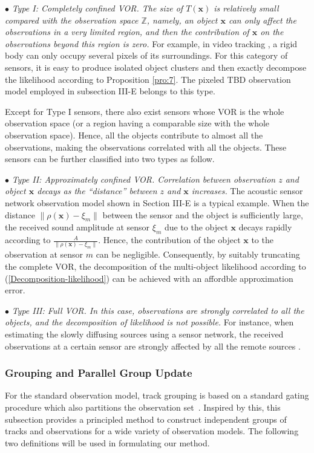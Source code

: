 \documentclass[journal]{IEEEtran}
\newcommand{\bx}{{\mathbf x}}
\begin{document}
{$\bullet$ \textit{Type I: Completely confined VOR. The size of  $T(\bx)$ is relatively small compared with the observation space $\mathbb{Z}$, namely,  an object $\bx$ can only affect  the observations in a  very limited region,  and then the  contribution of $\bx$ on the observations beyond this region is zero. } For example, in video tracking \cite{refr:MeMber_filter,refr:computer-vision,refr:vedio-tracking}, a  rigid body   can only occupy several  pixels of its surroundings. For this category of sensors, it is easy to produce  isolated object clusters  and then exactly decompose the likelihood according to Proposition \ref{pro:7}. The pixeled TBD observation model employed in subsection III-E belongs to this type.




Except for Type I sensors, there also exist sensors  whose VOR is  the whole observation space (or a region having a comparable  size with the whole observation space). Hence,  all the objects   contribute to almost all  the observations, making the  observations correlated with all the objects. These sensors    can be further classified into two types as follow.

$\bullet$ \textit{Type II: Approximately confined VOR. Correlation between  observation $z$ and  object $\bx$ decays as the ``distance'' between $z$ and $\bx$ increases. } The acoustic sensor network  observation model \cite{refr:amplitude} shown in Section III-E is a typical example. When the distance $\|\rho(\bx)-\xi_{m}\|$ between the sensor  and the object   is sufficiently large, the received sound amplitude  at sensor $\xi_{m}$ due to the object $\bx$ decays rapidly according to $\frac{A}{\|\rho(\bx)-\xi_{m}\|}$. Hence, the contribution of  the object $\bx$ to the observation  at sensor $m$ can be negligible. Consequently,   by suitably truncating the complete VOR,  the decomposition of the multi-object likelihood according to (\ref{Decomposition-likelihood}) can be achieved with an affordble approximation error. 

$\bullet$  \textit{Type III: Full VOR.  In this case, observations are strongly correlated to all the objects, and the decomposition of likelihood  is  not possible.}
For instance, when estimating the slowly diffusing sources using a sensor network, the received observations  at a certain sensor are strongly affected by  all the remote sources \cite{diffusion_source}. 

\subsubsection{Grouping and Parallel Group Update}
For  the standard observation model, track grouping is based on a standard gating procedure which also partitions the observation set~\cite{refr:JPDA,refr:label_5}.  
Inspired by this, this subsection provides  a principled method to construct independent groups of tracks and observations for a wide variety of observation models. 
The following two definitions  will be used in formulating our method. 

}
\end{document}
